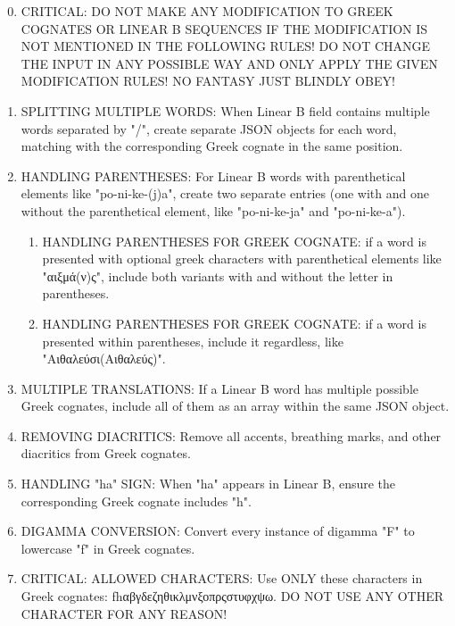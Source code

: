 \begin{enumerate}[label=\textbf{\arabic*.}, leftmargin=2.5em]
\setcounter{enumi}{-1}

\item CRITICAL: DO NOT MAKE ANY MODIFICATION TO GREEK COGNATES OR LINEAR B SEQUENCES IF THE MODIFICATION IS NOT MENTIONED IN THE FOLLOWING RULES! DO NOT CHANGE THE INPUT IN ANY POSSIBLE WAY AND ONLY APPLY THE GIVEN MODIFICATION RULES! NO FANTASY JUST BLINDLY OBEY!

\item SPLITTING MULTIPLE WORDS: When Linear B field contains multiple words separated by "/", create separate JSON objects for each word, matching with the corresponding Greek cognate in the same position.

\item HANDLING PARENTHESES: For Linear B words with parenthetical elements like "po-ni-ke-(j)a", create two separate entries (one with and one without the parenthetical element, like "po-ni-ke-ja" and "po-ni-ke-a").

\begin{enumerate}[label*=\textbf{\arabic*.}, leftmargin=2em]
  \item HANDLING PARENTHESES FOR GREEK COGNATE: if a word is presented with optional greek characters with parenthetical elements like "\textgreek{αιξμά(ν)ς}", include both variants with and without the letter in parentheses.
  \item HANDLING PARENTHESES FOR GREEK COGNATE: if a word is presented within parentheses, include it regardless, like "\textgreek{Αιθαλεύσι(Αιθαλεύς)}".
\end{enumerate}

\item MULTIPLE TRANSLATIONS: If a Linear B word has multiple possible Greek cognates, include all of them as an array within the same JSON object.

\item REMOVING DIACRITICS: Remove all accents, breathing marks, and other diacritics from Greek cognates.

\item HANDLING "ha" SIGN: When "ha" appears in Linear B, ensure the corresponding Greek cognate includes "h".

\item DIGAMMA CONVERSION: Convert every instance of digamma "F" to lowercase "f" in Greek cognates.

\item CRITICAL: ALLOWED CHARACTERS: Use ONLY these characters in Greek cognates: \textgreek{fhαβγδεζηθικλμνξοπρςστυφχψω}. DO NOT USE ANY OTHER CHARACTER FOR ANY REASON!


\end{enumerate}
